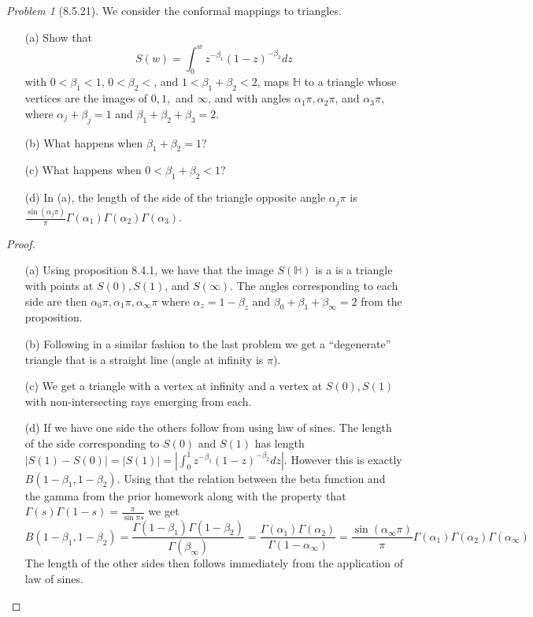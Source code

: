 \documentclass[10pt]{article}
\newcommand{\sk}{\vskip 10mm}
\newcommand{\bb}[1]{\mathbb{#1}}
\theoremstyle{remark}
\newtheorem{problem}{Problem}
\theoremstyle{remark}
\begin{document}
\sk

\begin{problem}[8.5.21]
  We consider the conformal mappings to triangles.
  \begin{enumerate}
  \item[(a)] Show that
    \[
      S(w)=\int_0^w z^{-\beta_1}(1-z)^{-\beta_2}dz
    \]
    with $0<\beta_1<1$, $0<\beta_2<$, and $1<\beta_1+\beta_2<2$, maps $\bb{H}$
    to a triangle whose vertices are the images of $0,1,$ and
    $\infty$, and with angles $\alpha_1\pi,\alpha_2\pi$, and $\alpha_3\pi$,
    where $\alpha_j+\beta_j=1$ and $\beta_1+\beta_2+\beta_3=2$.
  \item[(b)] What happens when $\beta_1+\beta_2=1$?
  \item[(c)] What happens when $0<\beta_1+\beta_2<1$?
  \item[(d)] In (a), the length of the side of the triangle opposite angle
    $\alpha_j\pi$ is
    $\frac{\sin(\alpha_j\pi)}{\pi}\Gamma(\alpha_1)\Gamma(\alpha_2)\Gamma(\alpha_3)$.
  \end{enumerate}
\end{problem}

\begin{proof}
  \begin{enumerate}
  \item[(a)] Using proposition 8.4.1, we have that the image $S(\bb{H})$ is a
    is a triangle with points at $S(0),S(1)$, and $S(\infty)$. The angles corresponding
    to each side are then $\alpha_0\pi,\alpha_1\pi,\alpha_\infty\pi$ where $\alpha_z=1-\beta_z$ and $\beta_0+\beta_1+\beta_\infty=2$ from
    the proposition.
  \item[(b)] Following in a similar fashion to the last problem we
    get a ``degenerate'' triangle that is a straight line (angle at infinity is $\pi$).
  \item[(c)] We get a triangle with a vertex at infinity and a vertex at $S(0),S(1)$ with
    non-intersecting rays emerging from each.
  \item[(d)] If we have one side the others follow from using law of sines. The length
    of the side corresponding to $S(0)$ and $S(1)$ has length $|S(1)-S(0)|=|S(1)|=|\int_0^1 z^{-\beta_1}(1-z)^{-\beta_2}dz|$.
    However this is exactly $B(1-\beta_1,1-\beta_2)$. Using that the relation between the
    beta function and the gamma from the prior homework along with the property
    that $\Gamma(s)\Gamma(1-s)=\frac{\pi}{\sin\pi s}$ we get
    \[
      B(1-\beta_1,1-\beta_2)=\frac{\Gamma(1-\beta_1)\Gamma(1-\beta_2)}{\Gamma(\beta_\infty)}=\frac{\Gamma(\alpha_1)\Gamma(\alpha_2)}{\Gamma(1-\alpha_\infty)}=\frac{\sin(\alpha_\infty\pi)}{\pi}\Gamma(\alpha_1)\Gamma(\alpha_2)\Gamma(\alpha_\infty)
    \]
    The length of the other sides then follows immediately from the application of
    law of sines.
  \end{enumerate}
\end{proof}
\end{document}
